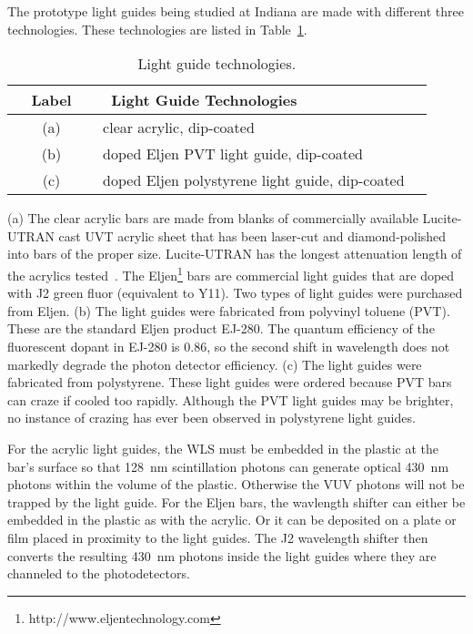 The prototype light guides being studied at Indiana are made with
different three technologies. These technologies are listed in
Table~\ref{tab:lightGuides}.
\begin{table}[ht]
  \begin{center}
    \caption{Light guide technologies.}
    \label{tab:lightGuides}
    \begin{tabular}{ c l  c }
      \hline
      \hline
      ~~Label~~ & ~Light Guide Technologies~  \\
      \hline
      (a) & clear acrylic, dip-coated  \\
      (b) & doped Eljen PVT light guide, dip-coated  \\
      (c) & doped Eljen polystyrene light guide, dip-coated   \\
      \hline
      \hline
    \end{tabular}
  \end{center}
\end{table}
(a) The clear acrylic bars are made from blanks of commercially
available Lucite-UTRAN cast UVT acrylic sheet that has been laser-cut
and diamond-polished into bars of the proper size.  Lucite-UTRAN has
the longest attenuation length of the acrylics
tested~\cite{bib:mufsonJINST}.  The
Eljen\footnote{http://www.eljentechnology.com} bars are commercial
light guides that are doped with J2 green fluor (equivalent to Y11).
Two types of light guides were purchased from Eljen.  (b) The light
guides were fabricated from polyvinyl toluene (PVT).  These are the
standard Eljen product EJ-280.  The quantum efficiency of the
fluorescent dopant in EJ-280 is 0.86, so the second shift in
wavelength does not markedly degrade the photon detector efficiency.
(c) The light guides were fabricated from polystyrene.  These light
guides were ordered because PVT bars can craze if cooled too rapidly.
Although the PVT light guides may be brighter, no instance of crazing
has ever been observed in polystyrene light guides.

For the acrylic light guides, the WLS must be embedded in the plastic
at the bar's surface so that 128~nm scintillation photons can generate
optical 430~nm photons within the volume of the plastic.  Otherwise
the VUV photons will not be trapped by the light guide.  For the Eljen
bars, the wavlength shifter can either be embedded in the plastic as
with the acrylic.  Or it can be deposited on a plate or film placed in
proximity to the light guides.  The J2 wavelength shifter then
converts the resulting 430~nm photons inside the light guides where
they are channeled to the photodetectors.

